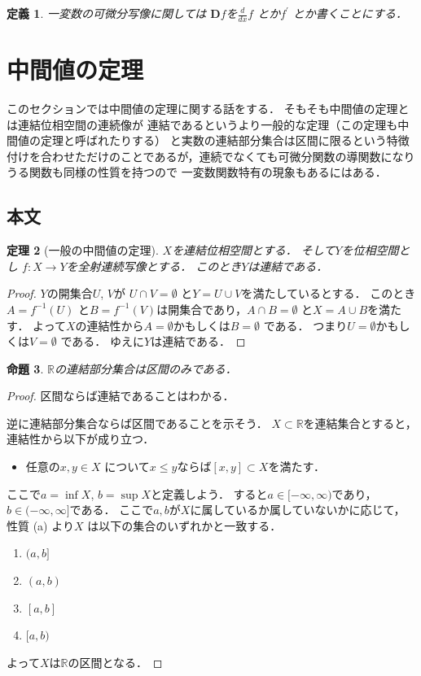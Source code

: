 \documentclass[leqno, a4paper, 12pt]{jsarticle}
\newtheorem{thm}{定理}
\newtheorem{prop}[thm]{命題}
\newtheorem{df}[thm]{定義}
\newcommand{\rr}{\mathbb{R}}
\newcommand{\ddd}{\mathbf{D}}
\newcommand{\bibun}[1]{#1^{\prime}}
\begin{document}
\begin{df}
一変数の可微分写像に関しては
$\ddd f$を$\frac{d}{dx}f$
とか$\bibun{f}$
とか書くことにする．
\end{df}
\section{中間値の定理}
このセクションでは中間値の定理に関する話をする．
そもそも中間値の定理とは連結位相空間の連続像が
連結であるというより一般的な定理（この定理も中間値の定理と呼ばれたりする）
と実数の連結部分集合は区間に限るという特徴付けを合わせただけのことであるが，連続でなくても可微分関数の導関数になりうる関数も同様の性質を持つので
一変数関数特有の現象もあるにはある．
\subsection{本文}

\begin{thm}[一般の中間値の定理]\label{thm:ippanninter}
$X$を連結位相空間とする．
そして$Y$を位相空間とし
$f: X\to Y$を全射連続写像とする．
このとき$Y$は連結である．
\end{thm}
\begin{proof}
$Y$の開集合$U$, $V$が
$U\cap V=\emptyset$
と$Y=U\cup V$を満たしているとする．
このとき$A=f^{-1}(U)$
と$B=f^{-1}(V)$は開集合であり，$A\cap B=\emptyset$
と$X=A\cup B$を満たす．
よって$X$の連結性から$A=\emptyset$かもしくは$B=\emptyset$
である．
つまり$U=\emptyset$かもしくは$V=\emptyset$
である．
ゆえに$Y$は連結である．
\end{proof}

\begin{prop}\label{prop:kukann}
$\rr$の連結部分集合は区間のみである．
\end{prop}
\begin{proof}
区間ならば連結であることはわかる．

逆に連結部分集合ならば区間であることを示そう．
$X\subset \rr$を連結集合とすると，
連結性から以下が成り立つ．
\begin{itemize}
\item[(a)]
任意の$x, y\in X$
について$x\le y$ならば$[x, y]\subset X$を満たす．
\end{itemize}
ここで$a=\inf X$, 
$b=\sup X$と定義しよう．
すると$a\in [-\infty, \infty)$であり，
$b\in (-\infty, \infty]$である．
ここで$a, b$が$X$に属しているか属していないかに応じて，
性質 (a) より$X$
は以下の集合のいずれかと一致する．
\begin{enumerate}
\item $(a, b]$
\item $(a, b)$
\item $[a, b]$
\item $[a, b)$
\end{enumerate}
よって$X$は$\rr$の区間となる．
\end{proof}
\end{document}
